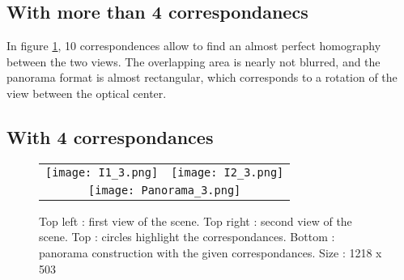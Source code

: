 \documentclass[12pt,a4paper,onecolumn]{article}
\begin{document}
\subsection{With more than 4 correspondanecs}

In figure \ref{many_corr}, 10 correspondences allow to find an almost perfect homography between the two views. The overlapping area is nearly not blurred, and the panorama format is almost rectangular, which corresponds to a rotation of the view between the optical center.

\subsection{With 4 correspondances}
\begin{figure}[H]
	\begin{center}
		\begin{tabular}{p{}  p{}}
			\texttt{[image: I1\_3.png]} &
			\texttt{[image: I2\_3.png]}   \\
			\multicolumn{2}{c}{\texttt{[image: Panorama\_3.png]}}
		\end{tabular}
	\end{center}
	\caption{Top left : first view of the scene. Top right : second view of the scene. Top : circles highlight the correspondances. Bottom : panorama construction with the given correspondances. Size : 1218 x 503}
	\label{many_corr}
\end{figure}
\end{document}

